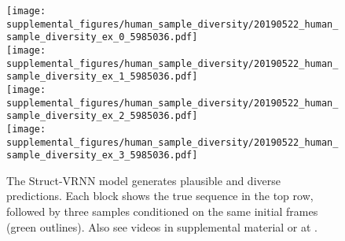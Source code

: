 \begin{figure*}[t]
    \centering
    \texttt{[image: supplemental\_figures/human\_sample\_diversity/20190522\_human\_sample\_diversity\_ex\_0\_5985036.pdf]}\\
    \vspace{0.1in}
    \texttt{[image: supplemental\_figures/human\_sample\_diversity/20190522\_human\_sample\_diversity\_ex\_1\_5985036.pdf]}\\
    \vspace{0.1in}
    \texttt{[image: supplemental\_figures/human\_sample\_diversity/20190522\_human\_sample\_diversity\_ex\_2\_5985036.pdf]}\\
    \vspace{0.1in}
    \texttt{[image: supplemental\_figures/human\_sample\_diversity/20190522\_human\_sample\_diversity\_ex\_3\_5985036.pdf]}
    \caption{The Struct-VRNN model generates plausible and diverse predictions. Each block shows the true sequence in the top row, followed by three samples conditioned on the same initial frames (green outlines). Also see videos in supplemental material or at \supplementalUrl.}
    \label{fig:human_sample_diversity}
\end{figure*}

